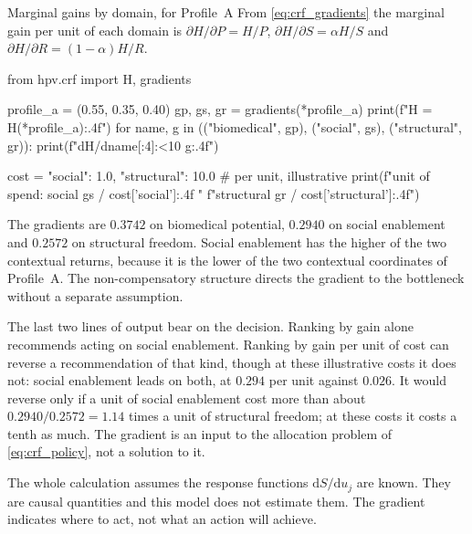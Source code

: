 \begin{workedexample}{Marginal gains by domain, for Profile~A}
From \eqref{eq:crf_gradients} the marginal gain per unit of each domain is
$\partial H/\partial P=H/P$, $\partial H/\partial S=\alpha H/S$ and
$\partial H/\partial R=(1-\alpha)H/R$.

\begin{wecode}[Python]
from hpv.crf import H, gradients

profile_a = (0.55, 0.35, 0.40)
gp, gs, gr = gradients(*profile_a)
print(f"H = {H(*profile_a):.4f}\n")
for name, g in (("biomedical", gp), ("social", gs), ("structural", gr)):
    print(f"dH/d{name[:4]:<10} {g:.4f}")

cost = {"social": 1.0, "structural": 10.0}   # per unit, illustrative
print(f"\nper unit of spend:  social {gs / cost['social']:.4f}   "
      f"structural {gr / cost['structural']:.4f}")
\end{wecode}

\noindent The gradients are $0.3742$ on biomedical potential, $0.2940$ on
social enablement and $0.2572$ on structural freedom. Social enablement has the
higher of the two contextual returns, because it is the lower of the two
contextual coordinates of Profile~A. The non-compensatory structure directs the
gradient to the bottleneck without a separate assumption.

The last two lines of output bear on the decision. Ranking by gain alone
recommends acting on social enablement. Ranking by gain per unit of cost can
reverse a recommendation of that kind, though at these illustrative costs it
does not: social enablement leads on both, at $0.294$ per unit against $0.026$.
It would reverse only if a unit of social enablement cost more than about
$0.2940/0.2572=1.14$ times a unit of structural freedom; at these costs it
costs a tenth as much. The gradient is an input to the allocation problem of
\eqref{eq:crf_policy}, not a solution to it.

The whole calculation assumes the response functions
$\mathrm{d}S/\mathrm{d}u_j$ are known. They are causal quantities and this
model does not estimate them. The gradient indicates where to act, not what an
action will achieve.

\end{workedexample}

